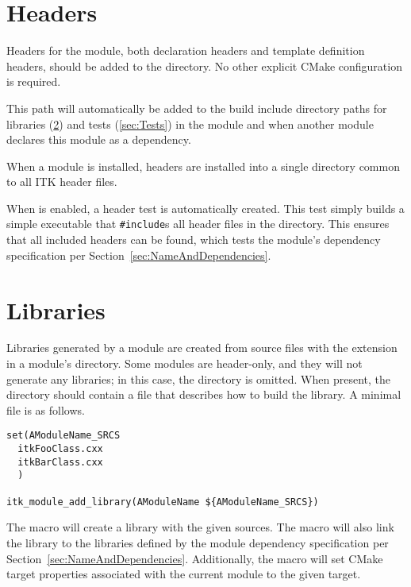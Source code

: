 \section{Headers}
\label{sec:Headers}

Headers for the module, both  declaration headers and 
template definition headers, should be added to the  directory.
No other explicit CMake configuration is required.

This path will automatically be added to the build include directory paths for
libraries (\ref{sec:Libraries}) and tests (\ref{sec:Tests}) in the module and when
another module declares this module as a dependency.

When a module is installed, headers are installed into a single
directory common to all ITK header files.

When  is enabled, a header test is automatically
created. This test simply builds a simple executable that \texttt{\#include}s
all header files in the  directory. This ensures that all
included headers can be found, which tests the module's dependency
specification per Section~\ref{sec:NameAndDependencies}.


\section{Libraries}
\label{sec:Libraries}

Libraries generated by a module are created from source files with the
 extension in a module's  directory. Some modules are
header-only, and they will not generate any libraries; in this case, the
 directory is omitted. When present, the  directory should
contain a  file that describes how to build the library.
A minimal  file is as follows.

\begin{verbatim}
set(AModuleName_SRCS
  itkFooClass.cxx
  itkBarClass.cxx
  )

itk_module_add_library(AModuleName ${AModuleName_SRCS})
\end{verbatim}

The  macro will create a library with the
given sources. The macro will also link the library to the
libraries defined by the module dependency
specification per Section~\ref{sec:NameAndDependencies}. Additionally, the
macro will set CMake target properties associated with the current module to
the given target.


